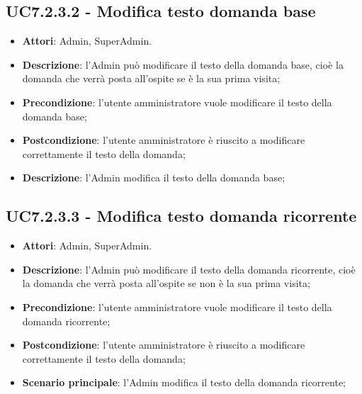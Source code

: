 \documentclass[../AnalisiDeiRequisiti_v4.0.0.tex]{subfiles}
\begin{document}
\subsection{UC7.2.3.2 - Modifica testo domanda base} 
\label{sssec:UC7.2.3.2} 
\begin{itemize} 
\item \textbf{Attori}: Admin, SuperAdmin.
\item \textbf{Descrizione}: l'Admin può modificare il testo della domanda base, cioè la domanda che verrà posta all'ospite se è la sua prima visita;
\item \textbf{Precondizione}: l'utente amministratore vuole modificare il testo della domanda base;
\item \textbf{Postcondizione}: l'utente amministratore è riuscito a modificare correttamente il testo della domanda;
\item \textbf{Descrizione}: l'Admin modifica il testo della domanda base;
\end{itemize} 
\subsection{UC7.2.3.3 - Modifica testo domanda ricorrente} 
\label{sssec:UC7.2.3.3} 
\begin{itemize} 
\item \textbf{Attori}: Admin, SuperAdmin.
\item \textbf{Descrizione}: l'Admin può modificare il testo della domanda ricorrente, cioè la domanda che verrà posta all'ospite se non è la sua prima visita;
\item \textbf{Precondizione}: l'utente amministratore vuole modificare il testo della domanda ricorrente;
\item \textbf{Postcondizione}: l'utente amministratore è riuscito a modificare correttamente il testo della domanda;
\item \textbf{Scenario principale}: l'Admin modifica il testo della domanda ricorrente;
\end{itemize}
\newpage
\end{document}
